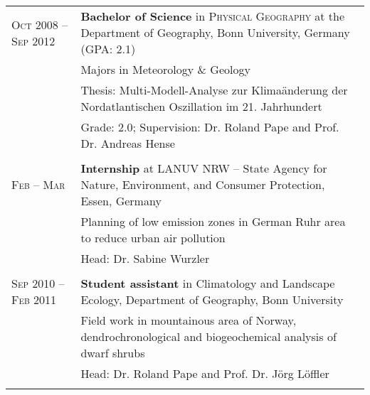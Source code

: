 \documentclass[a4paper,10pt]{article} %
\newcommand{\orcid}[1]{\href{https://orcid.org/#1}{\textcolor[HTML]{A6CE39}{\aiOrcid}}}
\begin{document}
\begin{longtable}{R{2cm}|p{13cm}}
\textsc{Oct 2008\,\,-- Sep 2012} & \textbf{Bachelor of Science} in \textsc{Physical Geography} at the Department of Geography, Bonn University, Germany (\textsc{GPA}: 2.1)\\
& \small{Majors in Meteorology \& Geology}\\
& \small{Thesis: Multi-Modell-Analyse zur Klimaänderung der Nordatlantischen Oszillation im 21. Jahrhundert}\\
& \small{Grade: 2.0; Supervision: Dr. Roland Pape and Prof. Dr. Andreas Hense \orcid{0000-0002-9251-146X}}\\
\\

\textsc{Feb --\,\,Mar } & \textbf{Internship} at LANUV NRW -- State Agency for Nature, Environment, and Consumer Protection, Essen, Germany\\
& \small{Planning of low emission zones in German Ruhr area to reduce urban air pollution}\\
& \small{Head: Dr. Sabine Wurzler}\\
\\

\textsc{Sep 2010\,\,--Feb 2011} & \textbf{Student assistant} in Climatology and Landscape Ecology, Department of Geography, Bonn University\\
& \small{Field work in mountainous area of Norway, dendrochronological and biogeochemical analysis of dwarf shrubs}\\
& \small{Head: Dr. Roland Pape and Prof. Dr. Jörg Löffler}\\
\\

\end{longtable}



\end{document}
